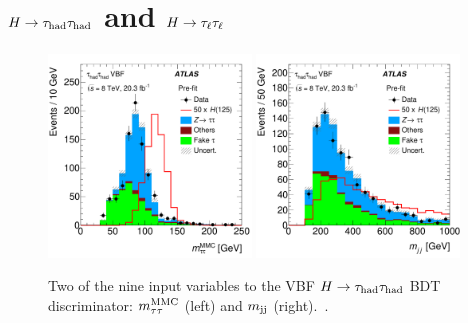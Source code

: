 \section{$H\rightarrow\tau_\text{had}\tau_\text{had}$ and $H\rightarrow\tau_\ell\tau_\ell$}
\label{sec:results-hhll}

\begin{figure}[tp]
  \centering
  \includegraphics[width=0.48\textwidth]{figures/HIGG-2013-32/figaux_09d}
  \includegraphics[width=0.48\textwidth]{figures/HIGG-2013-32/figaux_09c}
  \caption{Two of the nine input variables to the VBF $H\rightarrow\tau_\text{had}\tau_\text{had}$ BDT discriminator: $m_{\tau\tau}^\text{MMC}$ (left) and $m_{\text{jj}}$ (right).~\cite{HIGG-2013-32}.}
  \label{fig:results-inputs-hadhad}
\end{figure}

